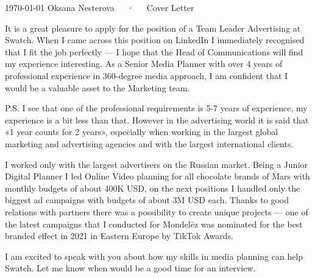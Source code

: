 \documentclass[11pt, a4paper]{awesome-cv}
\begin{document}
\makecvheader[R]

\makecvfooter
  {\today}
  {Oksana Nesterova~~~·~~~Cover Letter}
  {}

\makelettertitle

\begin{cvletter}

It is a great pleasure to apply for the position of a Team Leader Advertising at Swatch. When I came across this position on LinkedIn I immediately recognised that I fit the job perfectly --- I hope that the Head of Communications will find my experience interesting. As a Senior Media Planner with over 4 years of professional experience in 360-degree media approach, I am confident that I would be a valuable asset to the Marketing team. 

P.S. I see that one of the professional requirements is 5-7 years of experience, my experience is a bit less than that. However in the advertising world it is said that «1 year counts for 2 years», especially when working in the largest global marketing and advertising agencies and with the largest international clients.

I worked only with the largest advertisers on the Russian market. Being a Junior Digital Planner I led Online Video planning for all chocolate brands of Mars with monthly budgets of about 400K USD, on the next positions I handled only the biggest ad campaigns with budgets of about 3M USD each. Thanks to good relations with partners there was a possibility to create unique projects --- one of the latest campaigns that I conducted for Mondelēz was nominated for the best branded effect in 2021 in Eastern Europe by TikTok Awards.

I am excited to speak with you about how my skills in media planning can help Swatch. Let me know when would be a good time for an interview.

\end{cvletter}


\makeletterclosing
\end{document}
